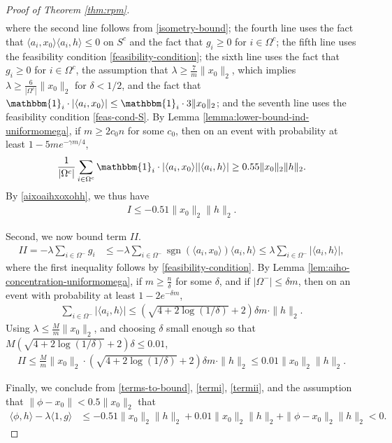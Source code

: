 \documentclass[12pt]{article}
\newcommand{\1}{\mathbbm{1}}
\DeclareMathOperator*{\sign}{sgn}
\newcommand{\xo}{x_0}
\newcommand{\Omegam}{\Omega^-}
\newcommand{\Omegac}{\Omega^c}
\newcommand{\ind}{\mathbbm{1}_i}
\newcommand{\aixo}{\langle a_i, \xo \rangle}
\newcommand{\aih}{\langle a_i, h \rangle}
\newcommand{\xoxohh}{\|\xo\|_2 \|h\|_2}
\begin{document}
\begin{proof}[Proof of Theorem \ref{thm:rpm}]
\begin{align}
\end{align}
where the second line follows from \eqref{isometry-bound};  the fourth line uses the fact that $\aixo \aih \leq 0$ on $S^c$ and the fact that $g_i \geq 0$ for $i \in \Omegac$; the fifth line uses the feasibility condition \eqref{feasibility-condition};  the sixth line uses the fact that $g_i \geq 0$ for $i \in \Omegac$, the  assumption that $\lambda \geq \frac{7}{m} \|\xo\|_2$, which implies $\lambda  \geq \frac{6}{|\Omegac|} \| \xo\|_2$ for $\delta < 1/2$, and the fact that $\ind \cdot | \aixo | \leq \ind \cdot 3 \| \xo \|_2$; and the seventh line uses the feasibility condition \eqref{feas-cond-S}. 
By Lemma \ref{lemma:lower-bound-ind-uniformomega}, if $m \geq 2 c_0 n$ for some $c_0$, then on an event with probability at least $1-5 m e^{-\gamma m/4}$, 
\begin{align*}
\frac{1}{|\Omegac|} \sum_{i\in\Omegac} \ind \cdot |\aixo| |\aih| \geq 0.55 \xoxohh.
\end{align*}
By \eqref{aixoaihxoxohh}, we thus have 
\begin{align}
I \leq -0.51 \xoxohh. \label{termi}
\end{align}

Second, we now bound term $II$.
\begin{align*}
II = -\lambda \sum_{i \in \Omegam} g_i  &\leq -\lambda \sum_{i \in \Omegam} \sign(\aixo) \aih \leq \lambda \sum_{i \in \Omegam} |\aih|,
\end{align*}
where the first inequality follows by \eqref{feasibility-condition}.
By Lemma \ref{lem:aiho-concentration-uniformomega}, if $m \geq \frac{n}{\delta}$ for some $\delta$, and if $|\Omegam| \leq \delta m$, then on an event with probability at least $1 - 2 e^{-\delta m}$, 
\begin{align*}
\sum_{i \in \Omegam} | \aih | \leq (\sqrt{4 + 2 \log(1/\delta)} + 2)  \delta  m \cdot \|h\|_2.
\end{align*}
Using $\lambda \leq \frac{M}{m} \| \xo \|_2$, and choosing $\delta$ small enough so that $M \left(\sqrt{4 + 2 \log(1/\delta)} + 2 \right) \delta \leq 0.01$, 
\begin{align}
II \leq \frac{M}{m}\|\xo\|_2 \cdot  \left(\sqrt{4 + 2 \log(1/\delta)} + 2 \right) \delta m \cdot \|h\|_2 \leq 0.01 \xoxohh. \label{termii}
\end{align}

Finally, we conclude from \eqref{terms-to-bound}, \eqref{termi}, \eqref{termii}, and the assumption that $\| \phi - \xo \| < 0.5 \| \xo \|_2$ that
\begin{align*}
\langle \phi, h \rangle - \lambda \langle 1, g \rangle &\leq -0.51 \xoxohh + 0.01 \xoxohh + \| \phi - \xo \|_2 \|h\|_2 < 0.
\end{align*}

\end{proof}
\end{document}
